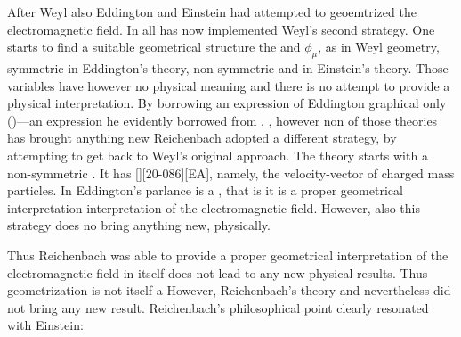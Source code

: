 \documentclass[draft]{article}
\begin{document}
After Weyl also Eddington and Einstein had attempted to geoemtrized the electromagnetic field. In all \uft has now implemented Weyl's second strategy. One starts to find a suitable geometrical structure the \gmn and $\phi_\mu$, as in Weyl geometry, symmetric \Gtmn in Eddington's theory\etc, non-symmetric \gmn and \Gtmn in Einstein's theory\etc. Those variables have however no physical meaning and there is no attempt to provide a physical interpretation. By borrowing an expression of Eddington graphical only  ()---an expression he evidently borrowed from \citet[294ff.]{Eddington1925a}. , however non of those theories has brought anything new Reichenbach adopted a different strategy, by attempting to get back to Weyl's original approach. The theory starts with a non-symmetric \Gtmn. It has [][20-086\me][EA], namely, the velocity-vector of charged mass particles. In Eddington's parlance is a , that is it is a proper geometrical interpretation interpretation of the electromagnetic field.  However, also this strategy does no bring anything new, physically. 

Thus Reichenbach was able to provide a proper geometrical interpretation of the electromagnetic field in itself does not lead to any new physical results. Thus geometrization is not itself a However, Reichenbach's theory and nevertheless did not bring any new result. Reichenbach's philosophical point clearly resonated with Einstein:
\end{document}
